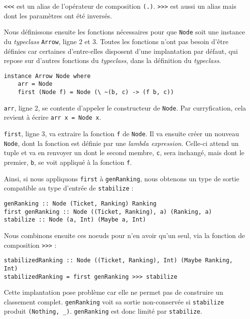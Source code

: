 \documentclass{llncs}
\newcommand{\Arrv}{\lstinline{Arrow}, }
\begin{document}
\lstinline{<<<} est un alias de l'opérateur de composition \lstinline{(.)}.
\lstinline{>>>} est aussi un alias mais dont les paramètres ont été inversés.

Nous définissons ensuite les fonctions nécessaires pour que \lstinline{Node} soit
une instance du \emph{typeclass} \Arrv ligne 2 et 3.
Toutes les fonctions n'ont pas besoin d'être définies car certaines d'entre-elles
disposent d'une implantation par défaut, qui repose sur d'autres fonctions du
\emph{typeclass}, dans la définition du \emph{typeclass}.

\begin{lstlisting}
instance Arrow Node where
    arr = Node
    first (Node f) = Node (\ ~(b, c) -> (f b, c))
\end{lstlisting}

\lstinline{arr}, ligne 2, se contente d'appeler le constructeur de \lstinline{Node}.
Par curryfication, cela revient à écrire \lstinline{arr x = Node x}.

\lstinline{first}, ligne 3, va extraire la fonction \lstinline{f} de \lstinline{Node}.
Il va ensuite créer un nouveau \lstinline{Node}, dont la fonction est définie par
une \emph{lambda expression}.
Celle-ci attend un tuple et va en renvoyer un dont le second membre, \lstinline{c},
sera inchangé, mais dont le premier, \lstinline{b}, se voit appliqué à la fonction \lstinline{f}.

Ainsi, si nous appliquons \lstinline{first} à \lstinline{genRanking}, nous obtenons
un type de sortie compatible au type d'entrée de \lstinline{stabilize} :
\begin{lstlisting}
genRanking :: Node (Ticket, Ranking) Ranking
first genRanking :: Node ((Ticket, Ranking), a) (Ranking, a)
stabilize :: Node (a, Int) (Maybe a, Int)
\end{lstlisting}

Nous combinons ensuite ces noeuds pour n'en avoir qu'un seul, via la fonction
de composition \lstinline{>>>} :
\begin{lstlisting}
stabilizedRanking :: Node ((Ticket, Ranking), Int) (Maybe Ranking, Int)
stabilizedRanking = first genRanking >>> stabilize
\end{lstlisting}

Cette implantation pose problème car elle ne permet pas de construire un classement
complet. \lstinline{genRanking} voit sa sortie non-conservée si \lstinline{stabilize}
produit \lstinline{(Nothing, _)}.
\lstinline{genRanking} est donc limité par \lstinline{stabilize}.
\end{document}
